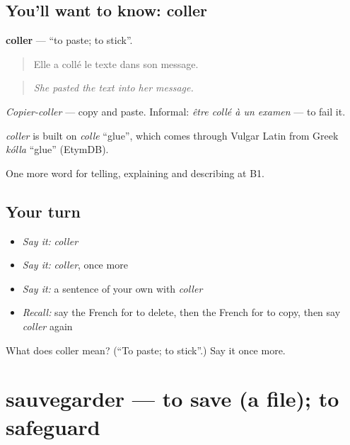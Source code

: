 \subsection*{You'll want to know: coller}
\textbf{coller} — \textquotedblleft{}to paste; to stick\textquotedblright{}.

\begin{quote}
Elle a collé le texte dans son message.
\end{quote}

\begin{quote}
\emph{She pasted the text into her message.}
\end{quote}

\emph{Copier-coller} — copy and paste. Informal: \emph{être collé à un examen} — to fail it.

\begin{cousinweb}
\emph{coller} is built on \emph{colle} \textquotedblleft{}glue\textquotedblright{}, which comes through Vulgar Latin from Greek \emph{kólla} \textquotedblleft{}glue\textquotedblright{} (EtymDB).
\end{cousinweb}

\begin{grammarlens}[title={What you've built}]
One more word for telling, explaining and describing at B1.
\end{grammarlens}

\subsection*{Your turn}
\begin{itemize}
\raggedright
  \item \emph{Say it:} \emph{coller}
  \item \emph{Say it:} \emph{coller}, once more
  \item \emph{Say it:} a sentence of your own with \emph{coller}
  \item \emph{Recall:} say the French for to delete, then the French for to copy, then say \emph{coller} again
\end{itemize}

\begin{tcolorbox}[breakable,colback=teal!4,colframe=teal!35!black,title={Before you move on}]
What does coller mean? (\textquotedblleft{}To paste; to stick\textquotedblright{}.) Say it once more.
\end{tcolorbox}
\section[sauvegarder]{sauvegarder — to save (a file); to safeguard}

